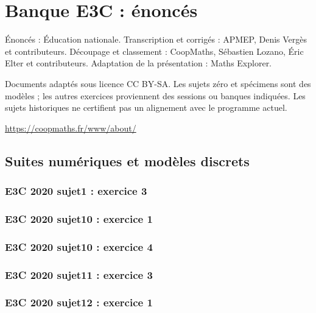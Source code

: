 \documentclass[lang=fr,edition=teacher,layout=sheet]{mxbook}
\begin{document}
\chapter*{Banque E3C : énoncés}
Énoncés : Éducation nationale. Transcription et corrigés : APMEP, Denis Vergès et contributeurs. Découpage et classement : CoopMaths, Sébastien Lozano, Éric Elter et contributeurs. Adaptation de la présentation : Maths Explorer.\par\medskip
\noindent Documents adaptés sous licence CC BY-SA. Les sujets zéro et spécimens sont des modèles ; les autres exercices proviennent des sessions ou banques indiquées. Les sujets historiques ne certifient pas un alignement avec le programme actuel.
\par\smallskip\url{https://coopmaths.fr/www/about/}
\clearpage\section*{Suites numériques et modèles discrets}
\subsection*{E3C 2020 sujet1 : exercice 3}
\begingroup\endgroup
\par\bigskip
{}\subsection*{E3C 2020 sujet10 : exercice 1}
\begingroup\endgroup
\par\bigskip
{}\subsection*{E3C 2020 sujet10 : exercice 4}
\begingroup\endgroup
\par\bigskip
{}\subsection*{E3C 2020 sujet11 : exercice 3}
\begingroup\endgroup
\par\bigskip
{}\subsection*{E3C 2020 sujet12 : exercice 1}
\end{document}

